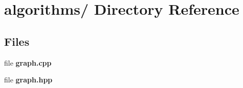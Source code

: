 \section{algorithms/ Directory Reference}
\label{dir_000003}
\subsection*{Files}
\begin{CompactItemize}
\item 
file {\bf graph.cpp}
\item 
file {\bf graph.hpp}
\end{CompactItemize}
